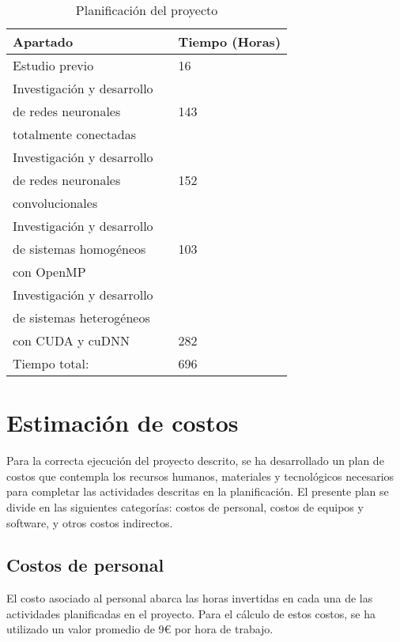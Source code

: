 \begin{table}[H]
	\centering
	\begin{tabular}{|lll|}
		\hline
		Apartado 	 &\vline  & Tiempo (Horas) \\
		\hline
		
		Estudio previo    & \vline & 16 \\			
		\hline
		Investigación y desarrollo  	 & \vline & 	\\
		de redes neuronales  	 & \vline & 143	\\
		totalmente conectadas 	 & \vline & 	\\
		\hline
		Investigación y desarrollo    & \vline & 	 \\	
		de redes neuronales    & \vline & 152	 \\			
		convolucionales    & \vline & 	 \\					
		\hline
		Investigación y desarrollo  	 & \vline & 	 \\
		de sistemas homogéneos  	 & \vline & 103	 \\
		con OpenMP 	 & \vline & 	 \\
		\hline
		Investigación y desarrollo     & \vline &  	\\
		de sistemas heterogéneos    & \vline &  \\ 
		con CUDA y cuDNN    & \vline & 282 \\ 	
		\hline
		\hline
		Tiempo total:				& \vline & 696 \\
		\hline
	\end{tabular}
	\caption{Planificación del proyecto}
	\label{tabla_planificación}
\end{table}

\section{Estimación de costos}

Para la correcta ejecución del proyecto descrito, se ha desarrollado un plan de costos que contempla los recursos humanos, materiales y tecnológicos necesarios para completar las actividades descritas en la planificación. El presente plan se divide en las siguientes categorías: costos de personal, costos de equipos y software, y otros costos indirectos.

\subsection{Costos de personal}

El costo asociado al personal abarca las horas invertidas en cada una de las actividades planificadas en el proyecto. Para el cálculo de estos costos, se ha utilizado un valor promedio de 9€ por hora de trabajo.


